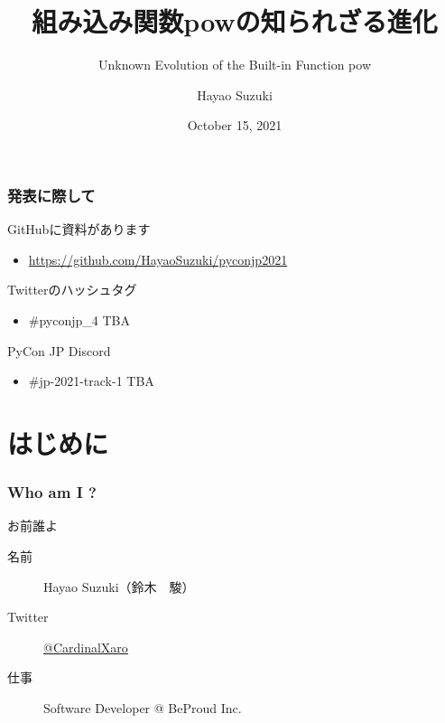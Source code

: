 \documentclass[aspectratio=169,dvipdfmx,14pt,notheorems]{beamer}
\title{組み込み関数powの知られざる進化}
\subtitle{Unknown Evolution of the Built-in Function pow}
\author[Hayao]{Hayao Suzuki}
\institute[PyCon JP 2021]{PyCon JP 2021}
\date{October 15, 2021}
\theoremstyle{definition}
\begin{document}
\begin{frame}[plain]\frametitle{}
\titlepage %
\end{frame}

\begin{frame}\frametitle{発表に際して}

\begin{block}{GitHubに資料があります}
\begin{itemize}
\item \url{https://github.com/HayaoSuzuki/pyconjp2021}
\end{itemize}
\end{block}

\begin{block}{Twitterのハッシュタグ}
\begin{itemize}
\item \#pyconjp\_4 TBA
\end{itemize}
\end{block}

\begin{block}{PyCon JP Discord}
\begin{itemize}
\item \#jp-2021-track-1 TBA
\end{itemize}
\end{block}
\end{frame}

\section{はじめに}

\begin{frame}\frametitle{Who am I ?}

\begin{block}{お前誰よ}
\begin{description}
\item[名前] Hayao Suzuki（鈴木　駿）
\item[Twitter] \href{https://twitter.com/CardinalXaro}{@CardinalXaro}
\item[仕事] Software Developer @ BeProud Inc.
\end{description}
\end{block}


\end{frame}
\end{document}
